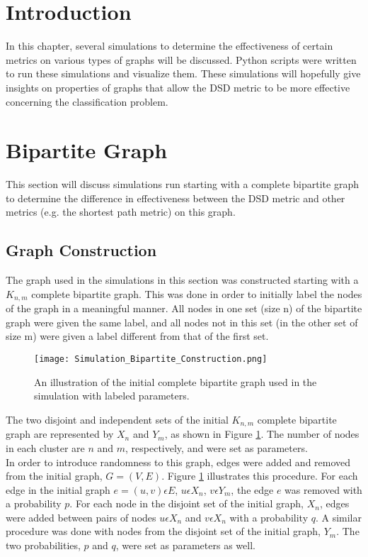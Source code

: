 \section{Introduction}
In this chapter, several simulations to determine the effectiveness of certain metrics on various types of graphs will be discussed. Python scripts were written to run these simulations and visualize them. These simulations will hopefully give insights on properties of graphs that allow the DSD metric to be more effective concerning the classification problem.

\section{Bipartite Graph}
This section will discuss simulations run starting with a complete bipartite graph to determine the difference in effectiveness between the DSD metric and other metrics (e.g. the shortest path metric) on this graph.

\subsection{Graph Construction}
The graph used in the simulations in this section was constructed starting with a $K_{n,m}$ complete bipartite graph. This was done in order to initially label the nodes of the graph in a meaningful manner. All nodes in one set (size n) of the bipartite graph were given the same label, and all nodes not in this set (in the other set of size m) were given a label different from that of the first set.\\

\begin{figure}[!ht]
\centering
\texttt{[image: Simulation\_Bipartite\_Construction.png]}
\caption{An illustration of the initial complete bipartite graph used in the simulation with labeled parameters.}
\label{fig:bip_construct}
\end{figure}

\noindent
The two disjoint and independent sets of the initial $K_{n,m}$ complete bipartite graph are represented by $X_{n}$ and $Y_{m}$, as shown in Figure \ref{fig:bip_construct}. The number of nodes in each cluster are $n$ and $m$, respectively, and were set as parameters.\\

\noindent
In order to introduce randomness to this graph, edges were added and removed from the initial graph, $G = (V,E)$. Figure \ref{fig:bip_construct} illustrates this procedure. For each edge in the initial graph $e=(u,v) \epsilon E$, $u \epsilon X_{n}$, $v \epsilon Y_{m}$, the edge $e$ was removed with a probability $p$. For each node in the disjoint set of the initial graph, $X_{n}$, edges were added between pairs of nodes $u \epsilon X_{n}$ and $v \epsilon X_{n}$ with a probability $q$. A similar procedure was done with nodes from the disjoint set of the initial graph, $Y_{m}$. The two probabilities, $p$ and $q$, were set as parameters as well.\\

